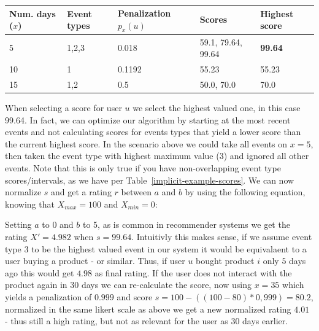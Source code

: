 %
%

\begin{table}[H]
  \centering
  \begin{tabular}{llm{2cm}ll}
    \toprule
    Num. days ($x$) & Event types & Penalization $p_{x}(u)$ & Scores & Highest score \\
    \midrule
    5   & 1,2,3 & 0.018   & 59.1, 79.64, 99.64 & \textbf{99.64} \\
    10  & 1     & 0.1192  & 55.23              & 55.23  \\
    15  & 1,2   & 0.5     & 50.0, 70.0         & 70.0 \\
    \bottomrule
  \end{tabular}
  \caption[]{}
  \label{events-example}
\end{table}

When selecting a score for user $u$ we select the highest valued one, in this
case 99.64. In fact, we can optimize our algorithm by starting at the most
recent events and not calculating scores for events types that yield a lower
score than the current highest score. In the scenario above we could take all
events on $x=5$, then taken the event type with highest maximum value (3) and
ignored all other events. Note that this is only true if you have
non-overlapping event type scores/intervals, as we have per
Table~\ref{implicit-example-scores}. We can now normalize $s$ and get a rating
$r$ between $a$ and $b$ by using the following equation, knowing that $X_{max}
= 100$ and $X_{min} = 0$:
%

Setting $a$ to 0 and $b$ to 5, as is common in recommender systems we get the
rating $X' = 4.982$ when $s = 99.64$. Intuitivly this makes sense, if we assume
event type 3 to be the highest valued event in our system it would be
equivalaent to a user buying a product - or similar. Thus, if user $u$ bought
product $i$ only $5$ days ago this would get $4.98$ as final rating. If the
user does not interact with the product again in 30 days we can re-calculate
the score, now using $x=35$ which yields a penalization of $0.999$ and score $s
= 100-((100-80)*0,999) = 80.2$, normalized in the same likert scale as above we
get a new normalized rating $4.01$ - thus still a high rating, but not as
relevant for the user as 30 days earlier.


